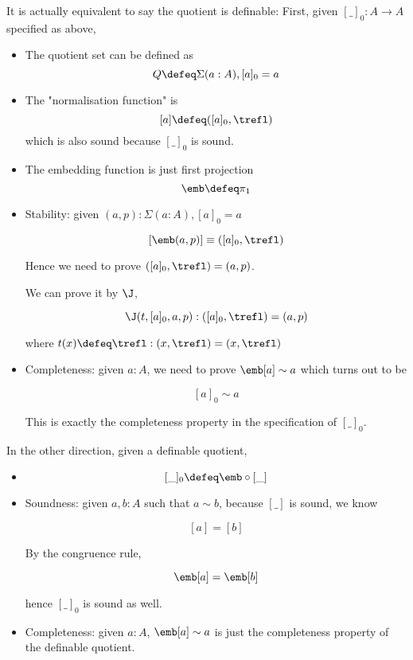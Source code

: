 It is actually equivalent to say the quotient is definable:
First, given $[\_]_0 : A \to A$ specified as above,

\begin{itemize}
\item The quotient set can be defined as
  $$Q \defeq \Sigma (a : A), [ a ]_0 = a$$

\item The "normalisation function" is
  $$[a] \defeq ([a]_0, \trefl ) $$
which is also sound because $[\_]_0$ is sound.

\item The embedding function is just first projection
  $$\emb \defeq \pi_1 $$

\item Stability: given $(a, p) : \Sigma (a : A), [ a ]_0 = a$

$$[\emb(a,p)] \equiv ([a]_0, \trefl )$$

Hence we need to prove $([a]_0, \trefl ) = (a, p)$.

We can prove it by $\J$,

$$\J(t,[ a ]_0,a,p) : ([a]_0, \trefl ) = (a, p)$$

where $t(x) \defeq \trefl : (x,\trefl ) = (x,\trefl )$

\item Completeness: given $a : A$, we need to prove $\emb[a] \sim a$ which turns out to be

$$[a]_0 \sim a$$

This is exactly the completeness property in the specification of $[\_]_0$.

\end{itemize}

In the other direction, given a definable quotient,

\begin{itemize}

\item $$[\_]_0 \defeq \emb \circ [\_]$$

\item Soundness: given $a,b : A$ such that $a \sim b$, because $[\_]$ is sound, we know

$$[ a ] = [ b ]$$

By the congruence rule,

$$\emb[a] = \emb [ b]$$

hence $[\_]_0$ is sound as well.


\item Completeness: given $a : A$, $\emb[a] \sim a$ is just the completeness property of the definable quotient.

\end{itemize}



